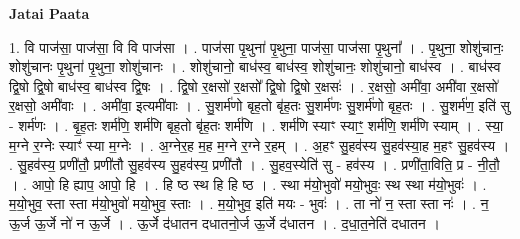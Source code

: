\documentclass[17pt]{extarticle}
\begin{document}
\textbf{Jatai Paata} \newline

1. वि पाज॑सा॒ पाज॑सा॒ वि वि पाज॑सा । . पाज॑सा पृ॒थुना॑ पृ॒थुना॒ पाज॑सा॒ पाज॑सा पृ॒थुना᳚ । . पृ॒थुना॒ शोशु॑चानः॒ शोशु॑चानः पृ॒थुना॑ पृ॒थुना॒ शोशु॑चानः । . शोशु॑चानो॒ बाध॑स्व॒ बाध॑स्व॒ शोशु॑चानः॒ शोशु॑चानो॒ बाध॑स्व । . बाध॑स्व द्वि॒षो द्वि॒षो बाध॑स्व॒ बाध॑स्व द्वि॒षः । . द्वि॒षो र॒क्षसो॑ र॒क्षसो᳚ द्वि॒षो द्वि॒षो र॒क्षसः॑ । . र॒क्षसो॒ अमी॑वा॒ अमी॑वा र॒क्षसो॑ र॒क्षसो॒ अमी॑वाः । . अमी॑वा॒ इत्यमी॑वाः । . सु॒शर्म॑णो बृह॒तो बृ॑ह॒तः सु॒शर्म॑णः सु॒शर्म॑णो बृह॒तः । . सु॒शर्म॑ण॒ इति॑ सु - शर्म॑णः । . बृ॒ह॒तः शर्म॑णि॒ शर्म॑णि बृह॒तो बृ॑ह॒तः शर्म॑णि । . शर्म॑णि स्याꣳ स्याꣳ॒॒ शर्म॑णि॒ शर्म॑णि स्याम् । . स्या॒ म॒ग्ने र॒ग्नेः स्याꣳ॑ स्या म॒ग्नेः । . अ॒ग्नेर॒ह म॒ह म॒ग्ने र॒ग्ने र॒हम् । . अ॒हꣳ सु॒हव॑स्य सु॒हव॑स्या॒ह म॒हꣳ सु॒हव॑स्य । . सु॒हव॑स्य॒ प्रणी॑तौ॒ प्रणी॑तौ सु॒हव॑स्य सु॒हव॑स्य॒ प्रणी॑तौ । . सु॒हव॒स्येति॑ सु - हव॑स्य । . प्रणी॑ता॒विति॒ प्र - नी॒तौ॒ । . आपो॒ हि ह्याप॒ आपो॒ हि । . हि ष्ठ स्थ हि हि ष्ठ । . स्था म॑यो॒भुवो॑ मयो॒भुवः॒ स्थ स्था म॑यो॒भुवः॑ । . म॒यो॒भुव॒ स्ता स्ता म॑यो॒भुवो॑ मयो॒भुव॒ स्ताः । . म॒यो॒भुव॒ इति॑ मयः - भुवः॑ । . ता नो॑ न॒ स्ता स्ता नः॑ । . न॒ ऊ॒र्ज ऊ॒र्जे नो॑ न ऊ॒र्जे । . ऊ॒र्जे द॑धातन दधातनो॒र्ज ऊ॒र्जे द॑धातन । . द॒धा॒त॒नेति॑ दधातन । \newline
\end{document}
